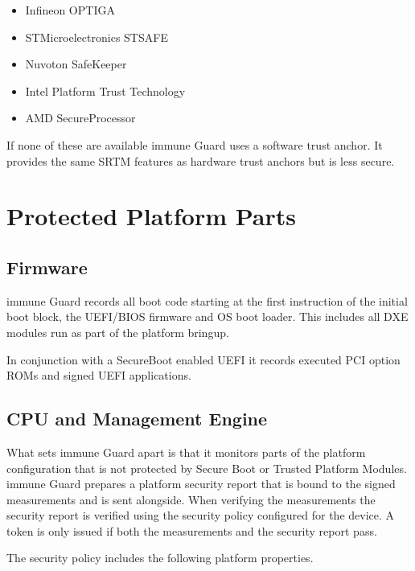 \documentclass[a4paper,oneside,10pt,extrafontsizes]{memoir}
\newcommand\todo[1]{\textcolor{red}{TODO: #1\newline}}
\begin{document}
\begin{itemize}
  \item Infineon OPTIGA
  \item STMicroelectronics STSAFE
  \item Nuvoton SafeKeeper
  \item Intel Platform Trust Technology
  \item AMD SecureProcessor
\end{itemize}

If none of these are available immune Guard uses a software trust anchor. It
provides the same SRTM features as hardware trust anchors but is less secure.


\section{Protected Platform Parts}
\subsection*{Firmware}

immune Guard records all boot code starting at the first instruction of the
initial boot block, the UEFI/BIOS firmware and OS boot loader. This includes
all DXE modules run as part of the platform bringup. 

In conjunction with a SecureBoot enabled UEFI it records executed PCI option
ROMs and signed UEFI applications.

\subsection*{CPU and Management Engine}

What sets immune Guard apart is that it monitors parts of the platform
configuration that is not protected by Secure Boot or Trusted Platform Modules.
immune Guard prepares a platform security report that is bound to the signed
measurements and is sent alongside. When verifying the measurements the security
report is verified using the security policy configured for the device. A token
is only issued if both the measurements and the security report pass.

The security policy includes the following platform properties.
\end{document}
